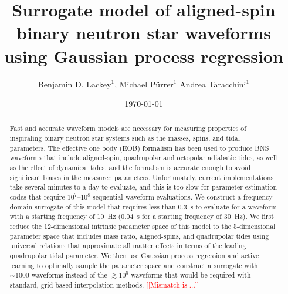 \documentclass[prd,aps,letter,twocolumn,floatfix,notitlepage,nofootinbib]{revtex4-1}
\newcommand{\red}[1]{\textcolor{red}{#1}}
\begin{document}
\title{Surrogate model of aligned-spin binary neutron star waveforms using Gaussian process regression}

\author{
Benjamin D. Lackey$^1$, 
Michael P\"{u}rrer$^1$
Andrea Taracchini$^1$
}

\date{\today}

\begin{abstract}

Fast and accurate waveform models are necessary for measuring properties of inspiraling binary neutron star systems such as the masses, spins, and tidal parameters. The effective one body (EOB) formalism has been used to produce BNS waveforms that include aligned-spin, quadrupolar and octopolar adiabatic tides, as well as the effect of dynamical tides, and the formalism is accurate enough to avoid significant biases in the measured parameters. Unfortunately, current implementations take several minutes to a day to evaluate, and this is too slow for parameter estimation codes that require $10^7$--$10^8$ sequential waveform evaluations. We construct a frequency-domain surrogate of this model that requires less than 0.3~s to evaluate for a waveform with a starting frequency of 10~Hz (0.04~s for a starting frequency of 30~Hz). We first reduce the 12-dimensional intrinsic parameter space of this model to the 5-dimensional parameter space that includes mass ratio, aligned-spins, and quadrupolar tides using universal relations that approximate all matter effects in terms of the leading quadrupolar tidal parameter. We then use Gaussian process regression and active learning to optimally sample the parameter space and construct a surrogate with $\sim 1000$ waveforms instead of the $\gtrsim 10^5$ waveforms that would be required with standard, grid-based interpolation methods. \red{[[Mismatch is ...]]}


\end{abstract}


\maketitle
\end{document}
